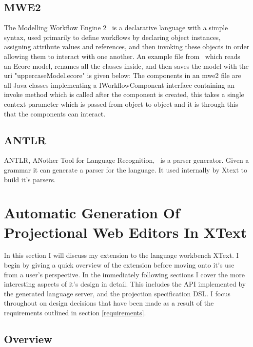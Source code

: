 \documentclass{article}
\begin{document}
\subsection{MWE2}
The Modelling Workflow Engine 2~\cite{mwe2} is a declarative language with a simple syntax, used primarily to define workflows by declaring object instances, assigning attribute values and references, and then invoking these objects in order allowing them to interact with one another. An example file from~\cite{mwe2} which reads an Ecore model, renames all the classes inside, and then saves the model with the uri "uppercaseModel.ecore" is given below: 
The components in an mwe2 file are all Java classes implementing a IWorkflowComponent interface containing an invoke method which is called after the component is created, this takes a single context parameter which is passed from object to object and it is through this that the components can interact. 
\subsection{ANTLR}
ANTLR, ANother Tool for Language Recognition,~\cite{antlr} is a parser generator. Given a grammar it can generate a parser for the language. It used internally by Xtext to build it's parsers.
%
%
%
%
%
%
%
\section{Automatic Generation Of Projectional Web Editors In XText}\label{generation}
In this section I will discuss my extension to the language workbench XText. I begin by giving a quick overview of the extension before moving onto it's use from a user's perspective. In the immediately following sections I cover the more interesting aspects of it's design in detail. This includes the API implemented by the generated language server, and the projection specification DSL. I focus throughout on design decisions that have been made as a result of the requirements outlined in section \ref{requirements}. 


\subsection{Overview}
\end{document}
